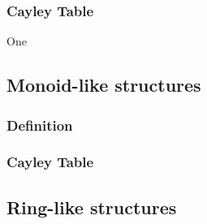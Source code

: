 \subsubsection{Cayley Table}
One 
\subsection{Monoid-like structures}
\subsubsection{Definition}
\subsubsection{Cayley Table}
\subsection{Ring-like structures}
